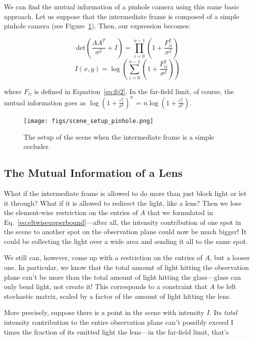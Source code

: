 \documentclass[11pt]{article}
\begin{document}
We can find the mutual information of a pinhole camera using this same basic approach. Let us suppose that the intermediate frame is composed of a simple pinhole camera (see Figure~\ref{fig:scene_setup_pinhole}). Then, our expression becomes:

\begin{equation}
    \mathrm{det}(\frac{AA^T}{\sigma^2} + I) = \prod_{i = 0}^{n-1} (1 + \frac{F_{ii}^2}{\sigma^2}) 
\end{equation}
\begin{equation}
    I(x, y) = \log (\sum_{i=0}^{n-1} (1+\frac{F_{ii}^2}{\sigma^2}))
\end{equation}

where $F_{ii}$ is defined in Equation~\ref{eq:fij2}. In the far-field limit, of course, the mutual information goes as $\log(1+\frac{c_f^2}{\sigma^2})^n$ = $n\log(1+\frac{c_f^2}{\sigma^2})$.

\begin{figure}
\centering
\texttt{[image: figs/scene\_setup\_pinhole.png]}
\caption{The setup of the scene when the intermediate frame is a simple occluder.}
\label{fig:scene_setup_pinhole}
\end{figure}

\subsection{The Mutual Information of a Lens}

What if the intermediate frame is allowed to do more than just block light or let it through? What if it is allowed to redirect the light, like a lens? Then we lose the element-wise restriction on the entries of $A$ that we formulated in Eq.~\ref{eq:eltwiseupperbound}---after all, the intensity contribution of one spot in the scene to another spot on the observation plane could now be much bigger! It could be collecting the light over a wide area and sending it all to the same spot.

We still can, however, come up with a restriction on the entries of $A$, but a looser one. In particular, we know that the total amount of light hitting the observation plane can't be more than the total amount of light hitting the glass---glass can only bend light, not create it! This corresponds to a constraint that $A$ be left stochastic matrix, scaled by a factor of the amount of light hitting the lens.

More precisely, suppose there is a point in the scene with intensity $I$. Its \emph{total} intensity contribution to the entire observation plane can't possibly exceed I times the fraction of its emitted light the lens---in the far-field limit, that's 
\end{document}
